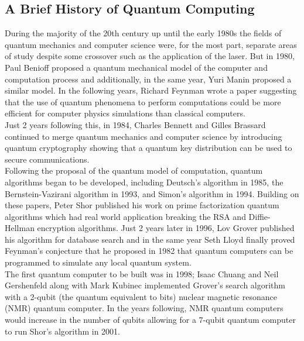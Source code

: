 \documentclass[reqno]{amsart}
\numberwithin{equation}{section}
\numberwithin{figure}{section}
\begin{document}
\subsection{A Brief History of Quantum Computing}
\begin{justify}
During the majority of the 20th century up until the early 1980s the fields of quantum mechanics and computer science were, for the most part, separate areas of study despite some crossover such as the application of the laser. But in 1980, Paul Benioff proposed a quantum mechanical model of the computer and computation process \cite{Benioff1980} and additionally, in the same year, Yuri Manin proposed a similar model. \cite{Manin1980} In the following years, Richard Feynman wrote a paper suggesting that the use of quantum phenomena to perform computations could be more efficient for computer physics simulations than classical computers. \cite{Feynman1982} \\
Just 2 years following this, in 1984, Charles Bennett and Gilles Brassard continued to merge quantum mechanics and computer science by introducing quantum cryptography \cite{BennettBrassard1984} showing that a quantum key distribution can be used to secure communications. \\

Following the proposal of the quantum model of computation, quantum algorithms began to be developed, including Deutsch's algorithm in 1985, \cite{Deutsch1985} the Bernstein-Vazirani algorithm in 1993, \cite{BernsteinVazirani1993} and Simon's algorithm in 1994. \cite{Simon1994} Building on these papers, Peter Shor published his work on prime factorization quantum algorithms which had real world application breaking the RSA and Diffie-Hellman encryption algorithms. \cite{Shor1994} Just 2 years later in 1996, Lov Grover published his algorithm for database search \cite{Grover1996} and in the same year Seth Lloyd finally proved Feynman's conjecture that he proposed in 1982 that quantum computers can be programmed to simulate any local quantum system. \cite{Lloyd1996} \\

The first quantum computer to be built was in 1998; Isaac Chuang and Neil Gershenfeld along with Mark Kubinec implemented Grover's search algorithm with a 2-qubit (the quantum equivalent to bits) nuclear magnetic resonance (NMR) quantum computer. \cite{ChuangGershefeldKubinec1998} In the years following, NMR quantum computers would increase in the number of qubits allowing for a 7-qubit quantum computer to run Shor's algorithm in 2001. \cite{Vandersypen2001} \\


\end{justify}
\end{document}
